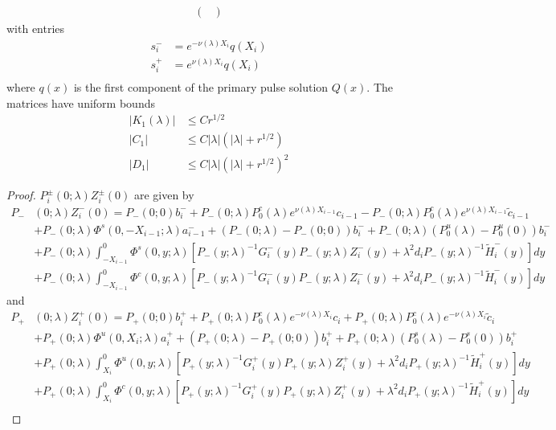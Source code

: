 \documentclass[thesis.tex]{subfiles}
\begin{document}
\begin{lemma}
\begin{align*}
\begin{pmatrix}
\end{pmatrix}
\end{align*}
with entries
\begin{align*}
s_i^- &= e^{-\nu(\lambda)X_i} q(X_i)\\
s_i^+ &= e^{\nu(\lambda)X_i} q(X_i)\\
\end{align*}
where $q(x)$ is the first component of the primary pulse solution $Q(x)$. The matrices have uniform bounds
\begin{align}\label{centerjumprem}
|K_1(\lambda)| &\leq C r^{1/2} \\
|C_1| &\leq C |\lambda|(|\lambda| + r^{1/2}) \\
|D_1| &\leq C |\lambda|(|\lambda| + r^{1/2})^2
\end{align}

\begin{proof}
$P_i^\pm(0; \lambda) Z_i^\pm(0)$ are given by
\begin{align*}
P_-&(0; \lambda) Z_i^-(0) = P_-(0; 0) b_i^- + P_-(0; \lambda)P_0^c(\lambda) e^{\nu(\lambda) X_{i-1}} c_{i-1} - P_-(0; \lambda)P_0^c(\lambda) e^{\nu(\lambda) X_{i-1}} \tilde{c}_{i-1} \\
&+ P_-(0; \lambda) \Phi^s(0, -X_{i-1}; \lambda) a_{i-1}^- + (P_-(0; \lambda) - P_-(0; 0))b_i^- + P_-(0; \lambda)(P_0^u(\lambda) - P_0^u(0))b_i^- \\
&+ P_-(0; \lambda) \int_{-X_{i-1}}^0 \Phi^s(0, y; \lambda) [P_-(y; \lambda)^{-1} G_i^-(y) P_-(y; \lambda)Z_i^-(y) + \lambda^2 d_i P_-(y; \lambda)^{-1} \tilde{H}_i^-(y)] dy \\
&+ P_-(0; \lambda) \int_{-X_{i-1}}^0 \Phi^c(0, y; \lambda) [P_-(y; \lambda)^{-1} G_i^-(y) P_-(y; \lambda)Z_i^-(y) + \lambda^2 d_i P_-(y; \lambda)^{-1} \tilde{H}_i^-(y)] dy
\end{align*}
and
\begin{align*}
P_+&(0; \lambda) Z_i^+(0) = P_+(0; 0) b_i^+ + P_+(0; \lambda) P_0^c(\lambda) e^{-\nu(\lambda)X_i} c_i + P_+(0; \lambda) P_0^c(\lambda) e^{-\nu(\lambda)X_i} \tilde{c}_i \\
&+ P_+(0; \lambda) \Phi^u(0, X_i; \lambda) a_i^+ + (P_+(0; \lambda) - P_+(0; 0)) b_i^+ + P_+(0; \lambda) (P_0^s(\lambda) - P_0^s(0)) b_i^+ \\
&+ P_+(0; \lambda) \int_{X_i}^0 \Phi^u(0, y; \lambda) [P_+(y; \lambda)^{-1} G_i^+(y) P_+(y; \lambda) Z_i^+(y) + \lambda^2 d_i P_+(y; \lambda)^{-1} \tilde{H}_i^+(y)] dy \\
&+ P_+(0; \lambda) \int_{X_i}^0 \Phi^c(0, y; \lambda) [P_+(y; \lambda)^{-1} G_i^+(y) P_+(y; \lambda) Z_i^+(y) + \lambda^2 d_i P_+(y; \lambda)^{-1} \tilde{H}_i^+(y)] dy \\
\end{align*}


\end{proof}
\end{lemma}
\end{document}
